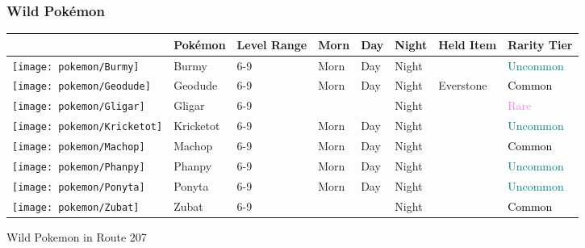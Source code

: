 \subsubsection{Wild Pokémon}%
\label{ssubsec:WildPokmon}%
\begin{longtable}{||l l l l l l l l||}%
\hline%
&Pokémon&Level Range&Morn&Day&Night&Held Item&Rarity Tier\\%
\hline%
\endhead%
\hline%
\texttt{[image: pokemon/Burmy]}&Burmy&6{-}9&Morn&Day&Night&&\textcolor{teal}{%
Uncommon%
}\\%
\hline%
\texttt{[image: pokemon/Geodude]}&Geodude&6{-}9&Morn&Day&Night&Everstone&\textcolor{black}{%
Common%
}\\%
\hline%
\texttt{[image: pokemon/Gligar]}&Gligar&6{-}9&&&Night&&\textcolor{violet}{%
Rare%
}\\%
\hline%
\texttt{[image: pokemon/Kricketot]}&Kricketot&6{-}9&Morn&Day&Night&&\textcolor{teal}{%
Uncommon%
}\\%
\hline%
\texttt{[image: pokemon/Machop]}&Machop&6{-}9&Morn&Day&Night&&\textcolor{black}{%
Common%
}\\%
\hline%
\texttt{[image: pokemon/Phanpy]}&Phanpy&6{-}9&Morn&Day&Night&&\textcolor{teal}{%
Uncommon%
}\\%
\hline%
\texttt{[image: pokemon/Ponyta]}&Ponyta&6{-}9&Morn&Day&Night&&\textcolor{teal}{%
Uncommon%
}\\%
\hline%
\texttt{[image: pokemon/Zubat]}&Zubat&6{-}9&&&Night&&\textcolor{black}{%
Common%
}\\%
\hline%
\end{longtable}%
\caption{Wild Pokemon in Route 207}